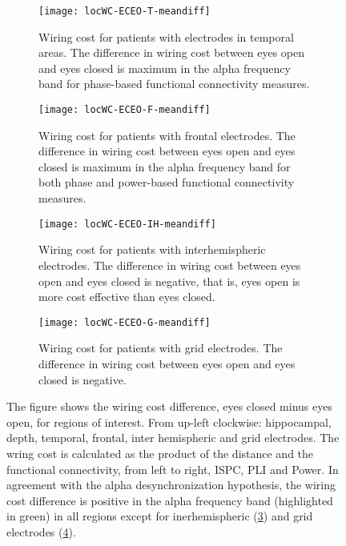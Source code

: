 \documentclass[11pt, onecolumn]{article}
\begin{document}
\begin{figure}[h]
  
  \begin{subfigure}[t]{0.5\linewidth}
    \centering
    \texttt{[image: locWC-ECEO-T-meandiff]} 
    \caption{Wiring cost for patients with electrodes in temporal areas. The difference in wiring cost between eyes open and eyes closed is maximum in the alpha frequency band for phase-based functional connectivity measures.} 
    \label{figi-2:c} 
  \end{subfigure} 
  \hspace{1ex}
 \begin{subfigure}[t]{0.5\linewidth}
    \centering
    \texttt{[image: locWC-ECEO-F-meandiff]} 
    \caption{Wiring cost for patients with frontal electrodes. The difference in wiring cost between eyes open and eyes closed is maximum in the alpha frequency band for both phase and power-based functional connectivity measures.} 
    \label{figi-2:d} 
  \end{subfigure} 
    \begin{subfigure}[t]{0.5\linewidth}
    \centering
    \texttt{[image: locWC-ECEO-IH-meandiff]} 
    \caption{Wiring cost for patients with interhemispheric electrodes. The difference in wiring cost between eyes open and eyes closed is negative, that is, eyes open is more cost effective than eyes closed.} 
    \label{figi-2:e} 
  \end{subfigure}%
    \hspace{1ex}
   \begin{subfigure}[t]{0.5\linewidth}
    \centering
    \texttt{[image: locWC-ECEO-G-meandiff]} 
    \caption{Wiring cost for patients with grid electrodes. The difference in wiring cost between eyes open and eyes closed is negative.} 
    \label{figi-2:f} 
  \end{subfigure} 
  \caption{The figure shows the wiring cost difference, eyes closed minus eyes open, for regions of interest. From up-left clockwise: hippocampal, depth, temporal, frontal, inter hemispheric and grid electrodes. The wring cost is calculated as the product of the distance and the functional connectivity, from left to right,  ISPC, PLI and Power. In agreement with the alpha desynchronization hypothesis, the wiring cost difference is positive in the alpha frequency band (highlighted in green) in all regions except for inerhemispheric (\ref{figi-2:e}) and grid electrodes (\ref{figi-2:f}).}
  \label{fig:figi-2} 
\end{figure}
 
\end{document}
